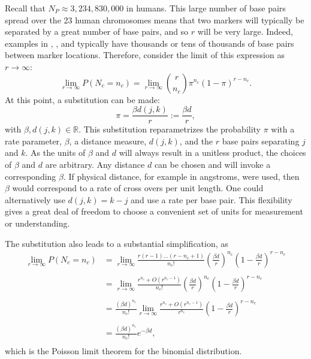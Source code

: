 \documentclass{article}
\newcommand{\field}[1]{\mathbb{#1}}
\newcommand{\Reals}{\field{R}}
\begin{document}
Recall that $N_P \approx 3,234,830,000$ in humans. This large number of base pairs spread over the 23 human chromosomes means that two markers will typically be separated by a great number of base pairs, and so $r$ will be very large. Indeed, examples in \cite{nyholt2004}, \cite{Salyakina2005}, and \cite{Galwey2009} typically have thousands or tens of thousands of base pairs between marker locations. Therefore, consider the limit of this expression as $r \rightarrow \infty$:
$$\lim_{r \rightarrow \infty} P(N_c = n_c) = \lim_{r \rightarrow \infty} {r \choose n_c} \pi^{n_c} (1-\pi)^{r - n_c}.$$
At this point, a substitution can be made:
$$\pi = \frac{\beta d(j,k)}{r} := \frac{\beta d}{r},$$
with $\beta, d(j,k) \in \Reals$. This substitution reparametrizes the probability $\pi$ with a rate parameter, $\beta$, a distance measure, $d(j,k)$, and the $r$ base pairs separating $j$ and $k$. As the units of $\beta$ and $d$ will always result in a unitless product, the choices of $\beta$ and $d$ are arbitrary. Any distance $d$ can be chosen and will invoke a corresponding $\beta$. If physical distance, for example in angstroms, were used, then $\beta$ would correspond to a rate of cross overs per unit length. One could alternatively use $d(j,k)=k-j$ and use a rate per base pair. This flexibility gives a great deal of freedom to choose a convenient set of units for measurement or understanding.

The substitution also leads to a substantial simplification, as
\begin{equation} \label{eq:poissonlim}
  \begin{split}
    \lim_{r \rightarrow \infty} P(N_c = n_c) & = \lim_{r \rightarrow \infty} \frac{r(r-1)\dots (r-n_c+1)}{n_c!} \left ( \frac{\beta d}{r} \right )^{n_c} \left ( 1-\frac{\beta d}{r} \right )^{r - n_c} \\
    & \\
    & = \lim_{r \rightarrow \infty} \frac{r^{n_c} + O(r^{n_c-1})}{n_c!} \left ( \frac{\beta d}{r} \right )^{n_c} \left ( 1-\frac{\beta d}{r} \right )^{r - n_c} \\
    & \\
    & = \frac{(\beta d)^{n_c}}{n_c!} \lim_{r \rightarrow \infty} \frac{r^{n_c} + O(r^{n_c-1})}{r^{n_c}} \left ( 1-\frac{\beta d}{r} \right )^{r - n_c} \\
    & \\
    & = \frac{(\beta d)^{n_c}}{n_c!} e^{-\beta d}, \\
  \end{split}
\end{equation}
\noindent which is the Poisson limit theorem for the binomial distribution.
\end{document}

